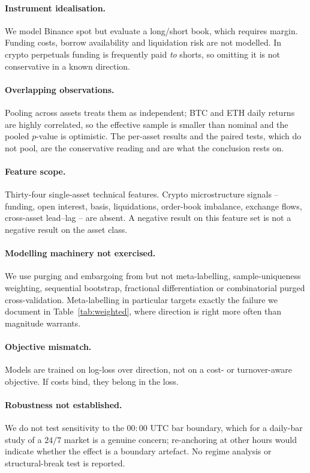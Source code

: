 \documentclass[preprint,12pt,authoryear]{elsarticle}
\begin{document}
\paragraph{Instrument idealisation.} We model Binance spot but evaluate a
long/short book, which requires margin. Funding costs, borrow availability and
liquidation risk are not modelled. In crypto perpetuals funding is frequently
paid \emph{to} shorts, so omitting it is not conservative in a known direction.

\paragraph{Overlapping observations.} Pooling across assets treats them as
independent; BTC and ETH daily returns are highly correlated, so the effective
sample is smaller than nominal and the pooled $p$-value is optimistic. The
per-asset results and the paired tests, which do not pool, are the conservative
reading and are what the conclusion rests on.

\paragraph{Feature scope.} Thirty-four single-asset technical features. Crypto
microstructure signals -- funding, open interest, basis, liquidations, order-book
imbalance, exchange flows, cross-asset lead--lag -- are absent. A negative result
on this feature set is not a negative result on the asset class.

\paragraph{Modelling machinery not exercised.} We use purging and embargoing from
\citet{lopezdeprado2018advances} but not meta-labelling, sample-uniqueness
weighting, sequential bootstrap, fractional differentiation or combinatorial
purged cross-validation. Meta-labelling in particular targets exactly the failure
we document in Table~\ref{tab:weighted}, where direction is right more often than
magnitude warrants.

\paragraph{Objective mismatch.} Models are trained on log-loss over direction,
not on a cost- or turnover-aware objective. If costs bind, they belong in the
loss.

\paragraph{Robustness not established.} We do not test sensitivity to the
$00{:}00$ UTC bar boundary, which for a daily-bar study of a $24/7$ market is a
genuine concern; re-anchoring at other hours would indicate whether the effect is
a boundary artefact. No regime analysis or structural-break test is reported.
\end{document}
